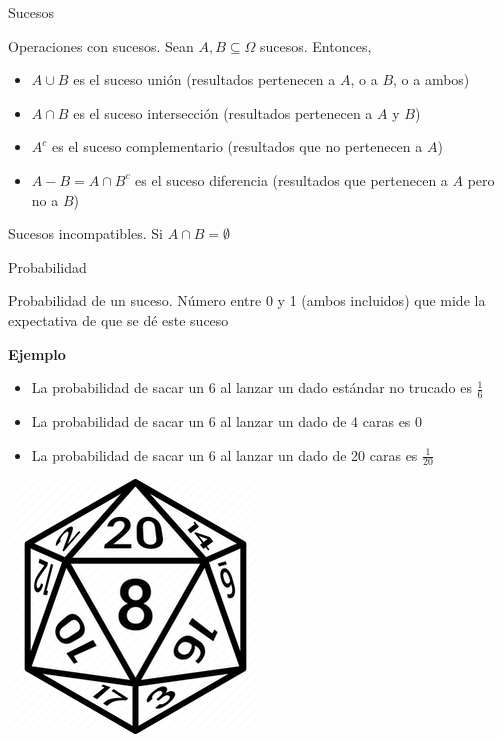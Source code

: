 \documentclass[
  ignorenonframetext,
]{beamer}
\providecommand{\tightlist}{%
  \setlength{\itemsep}{0pt}\setlength{\parskip}{0pt}}
\begin{document}
\begin{frame}{Sucesos}
\protect\hypertarget{sucesos-1}{}

Operaciones con sucesos. Sean \(A,B\subseteq \Omega\) sucesos. Entonces,

\begin{itemize}
\tightlist
\item
  \(A\cup B\) es el suceso unión (resultados pertenecen a \(A\), o a
  \(B\), o a ambos)
\item
  \(A\cap B\) es el suceso intersección (resultados pertenecen a \(A\) y
  \(B\))
\item
  \(A^c\) es el suceso complementario (resultados que no pertenecen a
  \(A\))
\item
  \(A-B = A\cap B^c\) es el suceso diferencia (resultados que pertenecen
  a \(A\) pero no a \(B\))
\end{itemize}

Sucesos incompatibles. Si \(A\cap B = \emptyset\)

\end{frame}

\begin{frame}{Probabilidad}
\protect\hypertarget{probabilidad}{}

Probabilidad de un suceso. Número entre 0 y 1 (ambos incluidos) que mide
la expectativa de que se dé este suceso

\textbf{Ejemplo}

\begin{itemize}
\tightlist
\item
  La probabilidad de sacar un 6 al lanzar un dado estándar no trucado es
  \(\frac{1}{6}\)
\item
  La probabilidad de sacar un 6 al lanzar un dado de 4 caras es \(0\)
\item
  La probabilidad de sacar un 6 al lanzar un dado de 20 caras es
  \(\frac{1}{20}\)
\end{itemize}

\includegraphics{Imgs/dado.png}

\end{frame}
\end{document}
